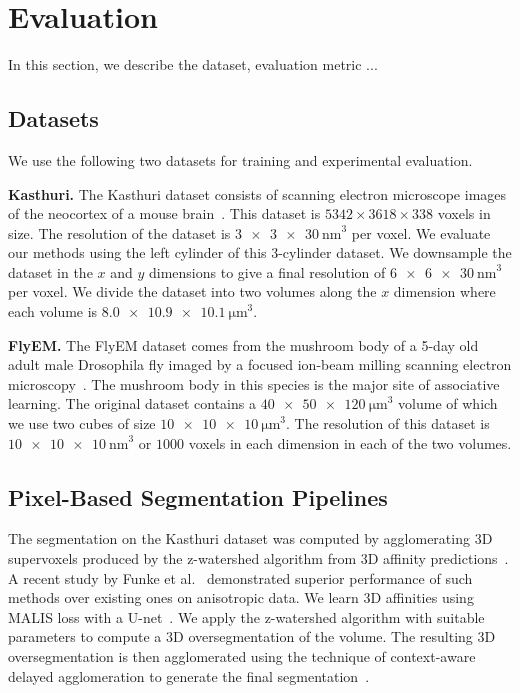 \section{Evaluation}
In this section, we describe the dataset, evaluation metric ...

\subsection{Datasets}
\label{sec:dataset}

We use the following two datasets for training and experimental evaluation.

\noindent\textbf{Kasthuri.}
The Kasthuri dataset consists of scanning electron microscope images of the neocortex of a mouse brain~\cite{kasthuri2015saturated}. This dataset is $5342 \times 3618 \times 338$ voxels in size. The resolution of the dataset is $\SI[product-units=single]{3 x 3 x 30}{\nano\meter}^3$ per voxel. We evaluate our methods using the left cylinder of this 3-cylinder dataset. We downsample the dataset in the $x$ and $y$ dimensions to give a final resolution of $\SI[product-units=single]{6 x 6 x 30}{\nano\meter}^3$ per voxel. We divide the dataset into two volumes along the $x$ dimension where each volume is $\SI[product-units=single]{8.0 x 10.9 x 10.1}{\micro\meter}^3$.

\noindent\textbf{FlyEM.}
The FlyEM dataset comes from the mushroom body of a 5-day old adult male Drosophila fly imaged by a focused ion-beam milling scanning electron microscopy~\cite{takemura2017connectome}. The mushroom body in this species is the major site of associative learning. The original dataset contains a $\SI[product-units=single]{40 x 50 x 120}{\micro\meter}^3$ volume of which we use two cubes of size $\SI[product-units=single]{10 x 10 x 10}{\micro\meter}^3$. The resolution of this dataset is $\SI[product-units=single]{10 x 10 x 10}{\nano\meter}^3$ or $1000$ voxels in each dimension in each of the two volumes.

\subsection{Pixel-Based Segmentation Pipelines}
\label{sec:neuroproof}

The segmentation on the Kasthuri dataset was computed by agglomerating 3D supervoxels produced by the z-watershed algorithm from 3D affinity predictions~\cite{zlateski2015image}. A recent study by Funke et al.~\cite{schlegel2017learning} demonstrated superior performance of such methods over existing ones on anisotropic data. We learn 3D affinities using MALIS loss with a U-net~\cite{Turaga:2009,ronneberger2015u}. We apply the z-watershed algorithm with suitable parameters to compute a 3D oversegmentation of the volume. The resulting 3D oversegmentation is then agglomerated using the technique of context-aware delayed agglomeration to generate the final segmentation~\cite{10.1371/journal.pone.0125825}.

